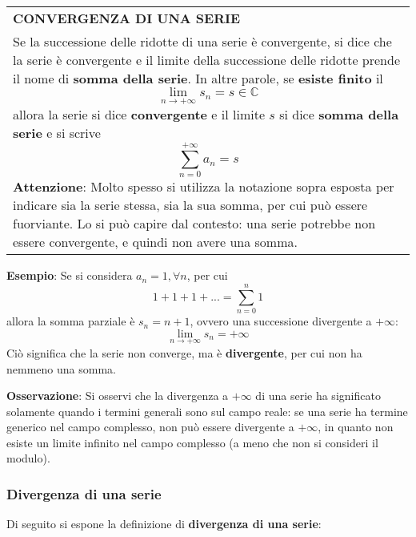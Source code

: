\documentclass[a4paper]{extarticle}
\renewcommand\arraystretch{}
\begin{document}
\vspace{1em}
\setlength{\tabcolsep}{14pt}
\renewcommand{\arraystretch}{2}
\noindent
\begin{tabularx}{\textwidth}{@{}|P|@{}}
    \hline
    {\textbf{CONVERGENZA DI UNA SERIE}}\\
    \parbox{\linewidth}{Se la successione delle ridotte di una serie è convergente, si dice che la serie è convergente e il limite della successione delle ridotte prende il nome di \textbf{somma della serie}.\\
    In altre parole, se \textbf{esiste finito} il
    \[\lim_{n \to +\infty} s_n = s \in \mathbb{C}\]
    allora la serie si dice \textbf{convergente} e il limite $s$ si dice \textbf{somma della serie} e si scrive
    \[\sum_{n=0}^{+\infty} a_n = s\]
    \textbf{Attenzione}: Molto spesso si utilizza la notazione sopra esposta per indicare sia la serie stessa, sia la sua somma, per cui può essere fuorviante. Lo si può capire dal contesto: una serie potrebbe non essere convergente, e quindi non avere una somma.\vspace{3mm}}\\
    \hline
\end{tabularx}

\vspace{2em}
\noindent
\textbf{Esempio}: Se si considera $a_n=1, \forall n$, per cui
\[1+1+1+... = \sum_{n=0}^{n} 1\]
allora la somma parziale è $s_n=n+1$, ovvero una successione divergente a $+\infty$:
\[\lim_{n \to +\infty} s_n = +\infty\]
Ciò significa che la serie non converge, ma è \textbf{divergente}, per cui non ha nemmeno una somma.

\vspace{1em}
\noindent
\textbf{Osservazione}: Si osservi che la divergenza a $+\infty$ di una serie ha significato solamente quando i termini generali sono sul campo reale: se una serie ha termine generico nel campo complesso, non può essere divergente a $+\infty$, in quanto non esiste un limite infinito nel campo complesso (a meno che non si consideri il modulo).

\vspace{1em}
\noindent
\subsubsection{Divergenza di una serie}
Di seguito si espone la definizione di \textbf{divergenza di una serie}:
\end{document}

